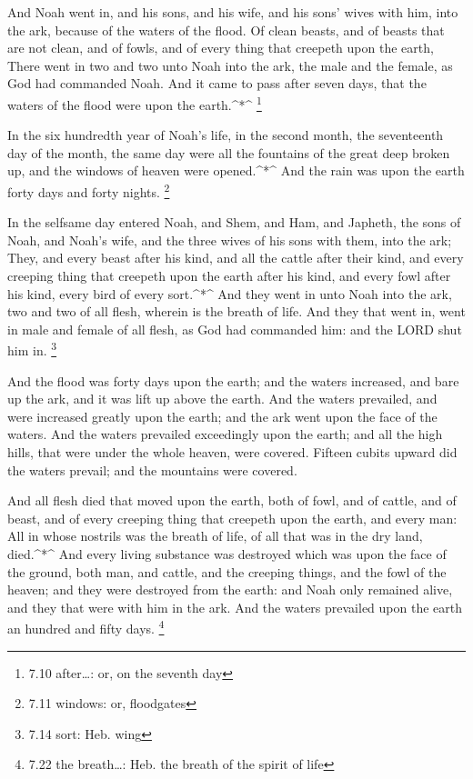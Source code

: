  And Noah went in, and his sons, and his wife, and his sons'
wives with him, into the ark, because of the waters of the flood.
 Of clean beasts, and of beasts that are not clean, and of
fowls, and of every thing that creepeth upon the earth, 
There went in two and two unto Noah into the ark, the male and the
female, as God had commanded Noah.  And it came to pass
after seven days, that the waters of the flood were upon the
earth.\^{}*\^{} \footnote{7.10 after\ldots: or, on the seventh day}

 In the six hundredth year of Noah's life, in the second
month, the seventeenth day of the month, the same day were all the
fountains of the great deep broken up, and the windows of heaven were
opened.\^{}*\^{}  And the rain was upon the earth forty
days and forty nights. \footnote{7.11 windows: or, floodgates}

 In the selfsame day entered Noah, and Shem, and Ham, and
Japheth, the sons of Noah, and Noah's wife, and the three wives of his
sons with them, into the ark;  They, and every beast after
his kind, and all the cattle after their kind, and every creeping thing
that creepeth upon the earth after his kind, and every fowl after his
kind, every bird of every sort.\^{}*\^{}  And they went in
unto Noah into the ark, two and two of all flesh, wherein is the breath
of life.  And they that went in, went in male and female of
all flesh, as God had commanded him: and the LORD shut him in.
\footnote{7.14 sort: Heb. wing}

 And the flood was forty days upon the earth; and the
waters increased, and bare up the ark, and it was lift up above the
earth.  And the waters prevailed, and were increased
greatly upon the earth; and the ark went upon the face of the waters.
 And the waters prevailed exceedingly upon the earth; and
all the high hills, that were under the whole heaven, were covered.
 Fifteen cubits upward did the waters prevail; and the
mountains were covered.

 And all flesh died that moved upon the earth, both of
fowl, and of cattle, and of beast, and of every creeping thing that
creepeth upon the earth, and every man:  All in whose
nostrils was the breath of life, of all that was in the dry land,
died.\^{}*\^{}  And every living substance was destroyed
which was upon the face of the ground, both man, and cattle, and the
creeping things, and the fowl of the heaven; and they were destroyed
from the earth: and Noah only remained alive, and they that were with
him in the ark.  And the waters prevailed upon the earth an
hundred and fifty days. \footnote{7.22 the breath\ldots: Heb. the breath
  of the spirit of life}

